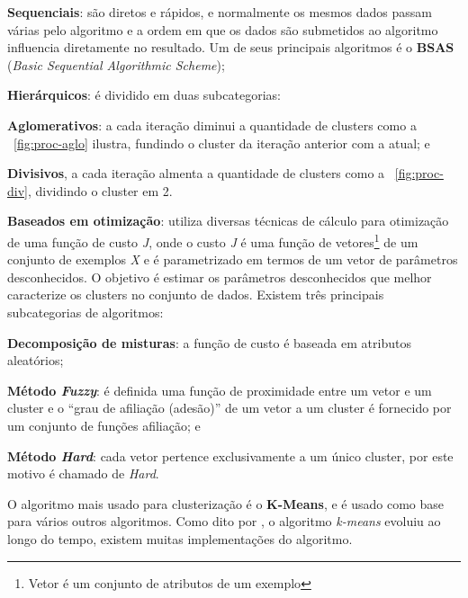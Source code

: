 \begin{alineas}
	\item \textbf{Sequenciais}: são diretos e rápidos, e normalmente os mesmos dados passam várias pelo algoritmo e a ordem em que os 
	dados são submetidos ao algoritmo influencia diretamente no resultado. Um de seus principais algoritmos é o \textbf{BSAS} (\textit{Basic Sequential Algorithmic Scheme});  
	
	\item \textbf{Hierárquicos}:  é dividido em duas subcategorias:
		\begin{alineas}
			\item \textbf{Aglomerativos}: a cada iteração diminui a quantidade de clusters como a ~\autoref{fig:proc-aglo} ilustra, fundindo o cluster da iteração anterior com a atual; e 
			\item \textbf{Divisivos}, a cada iteração almenta a quantidade de clusters como a ~\autoref{fig:proc-div}, dividindo o cluster em 2. 
		\end{alineas} 	
	\item \textbf{Baseados em otimização}: utiliza diversas técnicas de cálculo para otimização de uma função de custo \textit{J}, 
	onde o custo \textit{J} é uma função de vetores\footnote{Vetor é um conjunto de atributos de um exemplo} de um conjunto de exemplos \textit{X} e é parametrizado em termos de um 
	vetor de parâmetros desconhecidos. O objetivo é estimar os parâmetros desconhecidos que melhor caracterize os clusters no
	conjunto de dados. Existem três principais subcategorias de algoritmos:  
	\begin{alineas}
		\item \textbf{Decomposição de misturas}: a função de custo é baseada em atributos aleatórios;
		
		\item \textbf{Método \textit{Fuzzy}}: é definida uma função de proximidade entre um vetor e um cluster e o
		 “grau de afiliação (adesão)” de um vetor a um cluster é fornecido por um conjunto de funções afiliação; e	
		
		\item \textbf{Método \textit{Hard}}: cada vetor pertence exclusivamente a um único cluster, por este motivo é chamado de \textit{Hard}.		 	
	\end{alineas} 		
\end{alineas}   

O algoritmo mais usado para clusterização é o \textbf{K-Means}, e é usado como base para vários outros algoritmos.
Como dito por \cite{k-means}, o algoritmo \textit{k-means} evoluiu ao longo do tempo, existem muitas implementações do algoritmo.
 
